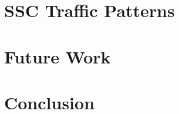 \documentclass[11pt,a4paper,headinclude,footinclude,chapterprefix=on]{scrreprt}
\begin{document}
\chapter{SSC Traffic Patterns}
\chapter{Future Work}
\chapter{Conclusion}

\pagebreak

%
\end{document}
